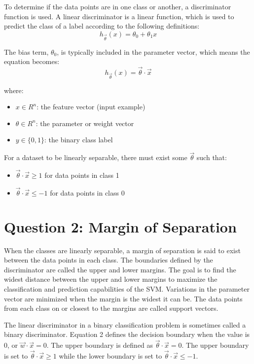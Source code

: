 \documentclass[letterpaper]{article}
\begin{document}
To determine if the data points are in one class or another, a discriminator function is used. A linear discriminator is a linear function, which is used to predict the class of a label according to the following definitions:
\begin{equation}
    h_{\overrightarrow{\theta}}(x) = \theta_0 + \theta_1x
\end{equation}

The bias term, $\theta_0$, is typically included in the parameter vector, which means the equation becomes:
\begin{equation}
    h_{\overrightarrow{\theta}}(x) = \overrightarrow{\theta} \cdot \overrightarrow{x}
\end{equation}

where:

\begin{itemize}
    \item $x \in R^n$: the feature vector (input example)
    \item $\theta \in R^n$: the parameter or weight vector
    \item $y \in \{0, 1\}$: the binary class label
\end{itemize}

For a dataset to be linearly separable, there must exist some $\overrightarrow{\theta}$ such that:
\begin{itemize}
    \item $\overrightarrow{\theta} \cdot \overrightarrow{x} \geq 1$ for data points in class 1
    \item $\overrightarrow{\theta} \cdot \overrightarrow{x} \leq -1$ for data points in class 0
\end{itemize}

\section{Question 2: Margin of Separation}
When the classes are linearly separable, a margin of separation is said to exist between the data points in each class. The boundaries defined by the discriminator are called the upper and lower margins. The goal is to find the widest distance between the upper and lower margins to maximize the classification and prediction capabilities of the SVM. Variations in the parameter vector are minimized when the margin is the widest it can be. The data points from each class on or closest to the margins are called support vectors.

The linear discriminator in a binary classification problem is sometimes called a binary discriminator. Equation 2 defines the decision boundary when the value is 0, or $\overrightarrow{w} \cdot \overrightarrow{x} = 0$. The upper boundary is defined as $\overrightarrow{\theta} \cdot \overrightarrow{x} = 0$. The upper boundary is set to $\overrightarrow{\theta} \cdot \overrightarrow{x} \geq 1$ while the lower boundary is set to $\overrightarrow{\theta} \cdot \overrightarrow{x} \leq -1$.
\end{document}
